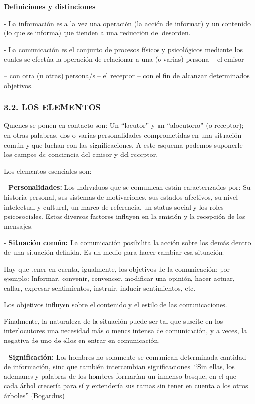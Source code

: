 \textbf{Definiciones y distinciones}

- La información es a la vez una operación (la acción de informar) y un contenido (lo que se informa) que tienden a una reducción del desorden.

- La comunicación es el conjunto de procesos físicos y psicológicos mediante los cuales se efectúa la operación de relacionar a una (o varias) persona – el emisor

– con otra (u otras) persona/s – el receptor – con el fin de alcanzar determinados objetivos.

\subsubsection*{3.2. LOS ELEMENTOS}


Quienes se ponen en contacto son: Un “locutor” y un “alocutorio” (o receptor); en otras palabras, dos o varias personalidades comprometidas en una situación común y que luchan con las significaciones. A este esquema podemos suponerle los campos de conciencia del emisor y del receptor.

Los elementos esenciales son:

- \textbf{Personalidades: }Los individuos que se comunican están caracterizados por: Su historia personal, sus sistemas de motivaciones, sus estados afectivos, su nivel intelectual y cultural, un marco de referencia, un status social y los roles psicosociales. Estos diversos factores influyen en la emisión y la recepción de los mensajes.

- \textbf{Situación común: }La comunicación posibilita la acción sobre los demás dentro de una situación definida. Es un medio para hacer cambiar esa situación.

Hay que tener en cuenta, igualmente, los objetivos de la comunicación; por ejemplo: Informar, convenir, convencer, modificar una opinión, hacer actuar, callar, expresar sentimientos, instruir, inducir sentimientos, etc.

Los objetivos influyen sobre el contenido y el estilo de las comunicaciones.

Finalmente, la naturaleza de la situación puede ser tal que suscite en los interlocutores una necesidad más o menos intensa de comunicación, y a veces, la negativa de uno de ellos en entrar en comunicación.

- \textbf{Significación: }Los hombres no solamente se comunican determinada cantidad de información, sino que también intercambian significaciones. “Sin ellas, los ademanes y palabras de los hombres formarían un inmenso bosque, en el que cada árbol crecería para sí y extendería sus ramas sin tener en cuenta a los otros árboles” (Bogardus)

